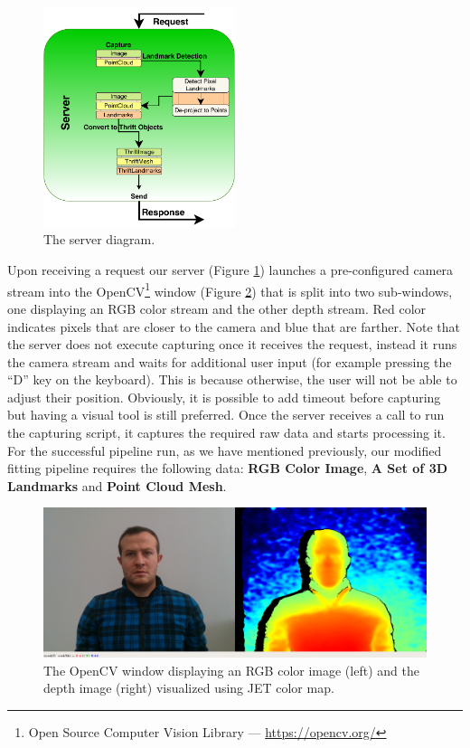 \begin{figure}
  \centering
  \includegraphics[width=0.5\textwidth]{Figures/Server.pdf}
  \caption{The server diagram.}
  \label{server}
\end{figure}

Upon receiving a request our server (Figure \ref{server}) launches a pre-configured camera stream into the OpenCV\footnote{Open Source Computer Vision Library — \url{https://opencv.org/}} window (Figure \ref{f3.5}) that is split into two sub-windows, one displaying an RGB color stream and the other depth stream. Red color indicates pixels that are closer to the camera and blue that are farther. Note that the server does not execute capturing once it receives the request, instead it runs the camera stream and waits for additional user input (for example pressing the “D” key on the keyboard). This is because otherwise, the user will not be able to adjust their position. Obviously, it is possible to add timeout before capturing but having a visual tool is still preferred.  Once the server receives a call to run the capturing script, it captures the required raw data and starts processing it. For the successful pipeline run, as we have mentioned previously, our modified fitting pipeline requires the following data: \textbf{RGB Color Image}, \textbf{A Set of 3D Landmarks} and \textbf{Point Cloud Mesh}.

\begin{figure}
  \centering
  \includegraphics[width=\textwidth]{Figures/Pictures/no-glasses.png}
  \caption{The OpenCV window displaying an RGB color image (left) and the depth image (right) visualized using JET color map. }
  \label{f3.5}
\end{figure}

